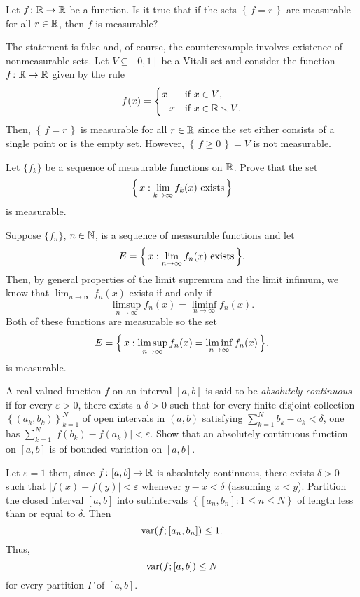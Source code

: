 \begin{problem}
  Let \(f\colon\mathbb{R}\to\mathbb{R}\) be a function. Is it true that if the sets
  \(\left\{\,f=r\,\right\}\) are measurable for all \(r\in\mathbb{R}\), then
  \(f\) is measurable?
\end{problem}
\begin{solution}
  The statement is false and, of course, the counterexample involves
  existence of nonmeasurable sets. Let \(V\subseteq[0,1]\) be a Vitali set
  and consider the function \(f\colon\mathbb{R}\to\mathbb{R}\) given by the rule
  \[
    f(x)=
    \begin{cases}
      x&\text{if \(x\in V\),}\\
      -x&\text{if \(x\in\mathbb{R}\smallsetminus V\).}
    \end{cases}
  \]
  Then, \(\left\{\,f=r\,\right\}\) is measurable for all \(r\in\mathbb{R}\) since
  the set either consists of a single point or is the empty set. However,
  \(\left\{\,f\geq 0\,\right\}=V\) is not measurable.
\end{solution}

\begin{problem}
  Let \(\{f_k\}\) be a sequence of measurable functions on \(\mathbb{R}\). Prove
  that the set
  \[
    \Bigl\{\,x:\text{\(\lim_{k\to\infty} f_k(x)\) exists}\,\Bigr\}
  \]
  is measurable.
\end{problem}
\begin{solution}
  Suppose \({\{f_n\}}\), \(n\in\mathbb{N}\), is a sequence of measurable
  functions and let
  \[
    E=\Bigl\{\,x: \text{\(\lim_{n\to\infty} f_n(x)\) exists} \,\Bigr\}.
  \]
  Then, by general properties of the limit supremum and the limit infimum,
  we know that \(\lim_{n\to\infty}f_n(x)\) exists if and only if
  \[
    \limsup_{n\to\infty}f_n(x)=\liminf_{n\to\infty}f_n(x).
  \]
  Both of these functions are measurable so the set
  \[
    E=\Bigl\{\,x:\limsup_{n\to\infty}f_n(x)=\liminf_{n\to\infty}f_n(x)\,\Bigr\}.
  \]
  is measurable.
\end{solution}

\begin{problem}
  A real valued function \(f\) on an interval \([a,b]\) is said to be
  \emph{absolutely continuous} if for every \(\varepsilon>0\), there exists
  a \(\delta>0\) such that for every finite disjoint collection
  \(\left\{(a_k,b_k)\right\}_{k=1}^N\) of open intervals in \((a,b)\)
  satisfying \(\sum_{k=1}^Nb_k-a_k<\delta\), one has
  \(\sum_{k=1}^N\left|f(b_k)-f(a_k)\right|<\varepsilon\). Show that an
  absolutely continuous function on \([a,b]\) is of bounded variation on
  \([a,b]\).
\end{problem}
\begin{solution}
  Let \(\varepsilon=1\) then, since \(f\colon[a,b]\to\mathbb{R}\) is absolutely
  continuous, there exists \(\delta>0\) such that
  \(|f(x)-f(y)|<\varepsilon\) whenever \(y-x<\delta\) (assuming
  \(x<y\)). Partition the closed interval \([a,b]\) into subintervals
  \(\left\{[a_n,b_n]:1\leq n\leq N\right\}\) of length less than or equal
  to \(\delta\). Then
  \[
    \operatorname{var}(f;[a_n,b_n])\leq 1.
  \]
  Thus,
  \[
    \operatorname{var}(f;[a,b])\leq N
  \]
  for every partition \(\Gamma\) of \([a,b]\).
\end{solution}

